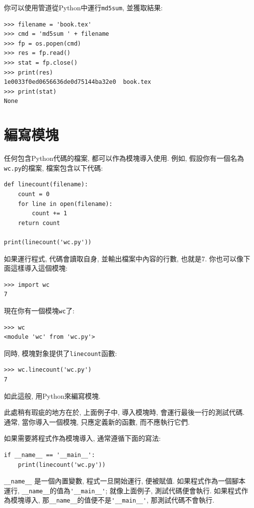 \documentclass[10pt]{book}
\begin{document}
你可以使用管道從Python中運行{\tt md5sum}, 並獲取結果:

\begin{verbatim}
>>> filename = 'book.tex'
>>> cmd = 'md5sum ' + filename
>>> fp = os.popen(cmd)
>>> res = fp.read()
>>> stat = fp.close()
>>> print(res)
1e0033f0ed0656636de0d75144ba32e0  book.tex
>>> print(stat)
None
\end{verbatim}



\section{編寫模塊}
\label{modules}
任何包含Python代碼的檔案, 都可以作為模塊導入使用. 
例如, 假設你有一個名為{\tt wc.py}的檔案, 檔案包含以下代碼:

\begin{verbatim}
def linecount(filename):
    count = 0
    for line in open(filename):
        count += 1
    return count

print(linecount('wc.py'))
\end{verbatim}
%
如果運行程式, 代碼會讀取自身, 並輸出檔案中內容的行數, 也就是7.
你也可以像下面這樣導入這個模塊:

\begin{verbatim}
>>> import wc
7
\end{verbatim}
%
現在你有一個模塊{\tt wc}了:

\begin{verbatim}
>>> wc
<module 'wc' from 'wc.py'>
\end{verbatim}
%
同時, 模塊對象提供了\verb"linecount"函數:

\begin{verbatim}
>>> wc.linecount('wc.py')
7
\end{verbatim}
%
如此這般, 用Python來編寫模塊. 

此處稍有瑕疵的地方在於, 上面例子中, 導入模塊時, 
會運行最後一行的測試代碼. 
通常, 當你導入一個模塊, 只應定義新的函數, 而不應執行它們.

如果需要將程式作為模塊導入, 通常遵循下面的寫法:

\begin{verbatim}
if __name__ == '__main__':
    print(linecount('wc.py'))
\end{verbatim}
%
\verb"__name__" 是一個內置變數, 程式一旦開始運行, 便被賦值. 
如果程式作為一個腳本運行, \verb"__name__"的值為\verb"'__main__'";
就像上面例子, 測試代碼便會執行. 
如果程式作為模塊導入, 那\verb"__name__"的值便不是\verb"'__main__'", 
那測試代碼不會執行. 
\end{document}
